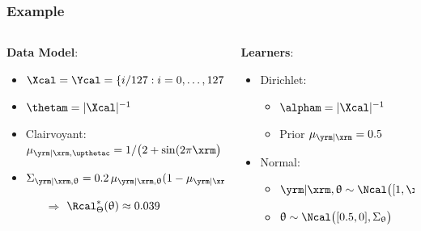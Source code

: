 \documentclass[aspectratio=169]{beamer}
\begin{document}
\begin{frame}
\frametitle{Example}

\begin{columns}[T]

\begin{column}{.5\linewidth}

\textbf{Data Model}:
\begin{itemize}
\item $\Xcal = \Ycal = \{i/127: i = 0, \ldots, 127\}$
\item $\thetam = |\Xcal|^{-1}$
\item \alert{Clairvoyant}: $\mu_{\yrm | \xrm,\upthetac} = 1 / \big(2 + \sin(2\pi \xrm\big)$
\item $\Sigma_{\yrm | \xrm, \uptheta} = 0.2 \, \mu_{\yrm | \xrm, \uptheta} (1 - \mu_{\yrm | \xrm, \uptheta})$
\begin{itemize}
\item[$\Rightarrow$] $\Rcal_{\Theta}^*(\uptheta) \approx 0.039$
\end{itemize}
\end{itemize}


\end{column}

\begin{column}{.5\linewidth}

\textbf{Learners}:
\begin{itemize}
\item Dirichlet:
\begin{itemize}
\item $\alpham = |\Xcal|^{-1}$ 
\item \alert{Prior} $\mu_{\yrm | \xrm} = 0.5$
\end{itemize}

\item Normal\footnotemark:
\begin{itemize}
\item $\yrm | \xrm, \uptheta \sim \Ncal\big([1, \xrm] \uptheta, 0.1 \big)$ 
\item $\uptheta \sim \Ncal\big([0.5, 0], \Sigma_{\uptheta}\big)$
\end{itemize}
\end{itemize}



\end{column}
\end{columns}
\end{frame}
\end{document}
